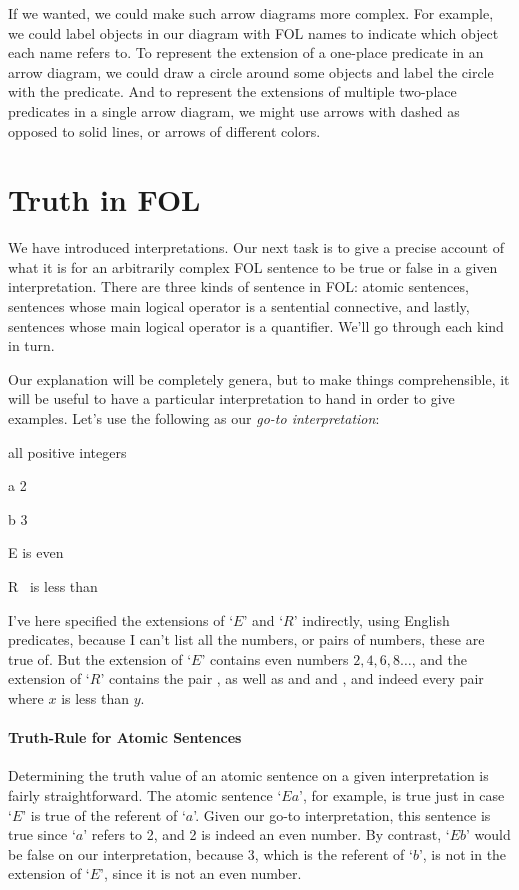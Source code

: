 If we wanted, we could make such arrow diagrams more complex. For example, we could label objects in our diagram with FOL names to indicate which object each name refers to.  To represent the extension of a one-place predicate in an arrow diagram, we could draw a circle around some objects and label the circle with the predicate. And to represent the extensions of multiple two-place predicates in a single arrow diagram, we might use arrows with dashed as opposed to solid lines, or arrows of different colors.



\section{Truth in FOL}\label{s:TruthFOL}

We have introduced interpretations. Our next task is to give a precise account of what it is for an arbitrarily complex FOL sentence to be true or false in a given interpretation. There are three kinds of sentence in FOL: atomic sentences, sentences whose main logical operator is a sentential connective, and lastly, sentences whose main logical operator is a quantifier.  We'll go through each kind in turn.

Our explanation will be completely genera, but to make things comprehensible, it will be useful to have a particular interpretation to hand in order to give examples.  Let's use the following as our \emph{go-to interpretation}:
\begin{ekey}
		\item[\text{Domain}] all positive integers
		\item[a] 2
		\item[b] 3
		\item[E] \blank is even
		\item[R] \blank \ is less than \blank
	\end{ekey}
I've here specified the extensions of `$E$' and `$R$' indirectly, using English predicates, because I can't list all the numbers, or pairs of numbers, these are true of.  But the extension of `$E$' contains even numbers $2, 4, 6, 8 \ldots$, and the extension of `$R$' contains the pair , as well as  and  and , and indeed every pair  where $x$ is less than $y$.

\paragraph{Truth-Rule for Atomic Sentences} Determining the truth value of an atomic sentence on a given interpretation is fairly straightforward.  The atomic sentence `$Ea$', for example, is true just in case `$E$' is true of the referent of `$a$'.  Given our go-to interpretation, this sentence is true since `$a$' refers to 2, and 2 is indeed an even number.  By contrast, `$Eb$' would be false on our interpretation, because 3, which is the referent of `$b$', is not in the extension of `$E$', since it is not an even number.

